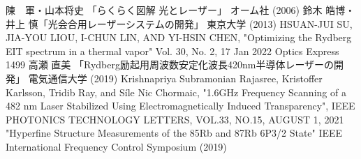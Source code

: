 \begin{thebibliography}{99}
 陳　軍・山本将史 「らくらく図解 光とレーザー」 オーム社 (2006)
鈴木 皓博・井上 慎「光会合用レーザーシステムの開発」 東京大学 (2013)
HSUAN-JUI SU, JIA-YOU LIOU, I-CHUN LIN, AND YI-HSIN CHEN, "Optimizing the Rydberg EIT spectrum in a thermal vapor" Vol. 30, No. 2, 17 Jan 2022 Optics Express 1499
高瀬 直美 「Rydberg励起用周波数安定化波長420nm半導体レーザーの開発」 電気通信大学 (2019)
Krishnapriya Subramonian Rajasree, Kristoffer Karlsson, Tridib Ray, and Síle Nic Chormaic, "1.6GHz Frequency Scanning of a 482 nm Laser Stabilized Using Electromagnetically Induced Transparency", IEEE PHOTONICS TECHNOLOGY LETTERS, VOL.33, NO.15, AUGUST 1, 2021
"Hyperfine Structure Measurements of the 85Rb and 87Rb 6P3/2 State" IEEE International Frequency Control Symposium (2019)
\end{thebibliography}